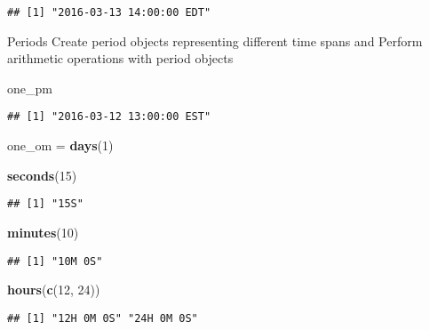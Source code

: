 \documentclass[
]{article}
\newenvironment{Shaded}{\begin{snugshade}}{\end{snugshade}}
\newcommand{\DecValTok}[1]{\textcolor[rgb]{0.00,0.00,0.81}{#1}}
\newcommand{\FunctionTok}[1]{\textcolor[rgb]{0.13,0.29,0.53}{\textbf{#1}}}
\newcommand{\NormalTok}[1]{#1}
\newcommand{\OtherTok}[1]{\textcolor[rgb]{0.56,0.35,0.01}{#1}}
\begin{document}
\begin{verbatim}
## [1] "2016-03-13 14:00:00 EDT"
\end{verbatim}

Periods Create period objects representing different time spans and
Perform arithmetic operations with period objects

\begin{Shaded}
\begin{Highlighting}[]
\NormalTok{one\_pm}
\end{Highlighting}
\end{Shaded}

\begin{verbatim}
## [1] "2016-03-12 13:00:00 EST"
\end{verbatim}

\begin{Shaded}
\begin{Highlighting}[]
\NormalTok{one\_om }\OtherTok{=} \FunctionTok{days}\NormalTok{(}\DecValTok{1}\NormalTok{)}
\end{Highlighting}
\end{Shaded}

\begin{Shaded}
\begin{Highlighting}[]
\FunctionTok{seconds}\NormalTok{(}\DecValTok{15}\NormalTok{)}
\end{Highlighting}
\end{Shaded}

\begin{verbatim}
## [1] "15S"
\end{verbatim}

\begin{Shaded}
\begin{Highlighting}[]
\FunctionTok{minutes}\NormalTok{(}\DecValTok{10}\NormalTok{)}
\end{Highlighting}
\end{Shaded}

\begin{verbatim}
## [1] "10M 0S"
\end{verbatim}

\begin{Shaded}
\begin{Highlighting}[]
\FunctionTok{hours}\NormalTok{(}\FunctionTok{c}\NormalTok{(}\DecValTok{12}\NormalTok{, }\DecValTok{24}\NormalTok{))}
\end{Highlighting}
\end{Shaded}

\begin{verbatim}
## [1] "12H 0M 0S" "24H 0M 0S"
\end{verbatim}
\end{document}
